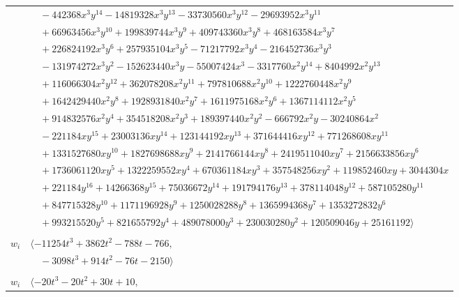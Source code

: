 \documentclass[11pt]{article}
\begin{document}
\begin{longtable}{@{}ll@{}}
 & $\quad -442368x^{3}y^{14}-14819328x^{3}y^{13}-33730560x^{3}y^{12}-29693952x^{3}y^{11}$\\
 & $\quad +66963456x^{3}y^{10}+199839744x^{3}y^{9}+409743360x^{3}y^{8}+468163584x^{3}y^{7}$\\
 & $\quad +226824192x^{3}y^{6}+257935104x^{3}y^{5}-71217792x^{3}y^{4}-216452736x^{3}y^{3}$\\
 & $\quad -131974272x^{3}y^{2}-152623440x^{3}y-55007424x^{3}-3317760x^{2}y^{14}+8404992x^{2}y^{13}$\\
 & $\quad +116066304x^{2}y^{12}+362078208x^{2}y^{11}+797810688x^{2}y^{10}+1222760448x^{2}y^{9}$\\
 & $\quad +1642429440x^{2}y^{8}+1928931840x^{2}y^{7}+1611975168x^{2}y^{6}+1367114112x^{2}y^{5}$\\
 & $\quad +914832576x^{2}y^{4}+354518208x^{2}y^{3}+189397440x^{2}y^{2}-666792x^{2}y-30240864x^{2}$\\
 & $\quad -221184xy^{15}+23003136xy^{14}+123144192xy^{13}+371644416xy^{12}+771268608xy^{11}$\\
 & $\quad +1331527680xy^{10}+1827698688xy^{9}+2141766144xy^{8}+2419511040xy^{7}+2156633856xy^{6}$\\
 & $\quad +1736061120xy^{5}+1322259552xy^{4}+670361184xy^{3}+357548256xy^{2}+119852460xy+3044304x$\\
 & $\quad +221184y^{16}+14266368y^{15}+75036672y^{14}+191794176y^{13}+378114048y^{12}+587105280y^{11}$\\
 & $\quad +847715328y^{10}+1171196928y^{9}+1250028288y^{8}+1365994368y^{7}+1353272832y^{6}$\\
 & $\quad +993215520y^{5}+821655792y^{4}+489078000y^{3}+230030280y^{2}+120509046y+25161192\rangle$\\
\addlinespace[2pt]
\multicolumn{2}{@{}p{0.97\textwidth}@{}}{$i=12$, $D_i=16$, $\rho_{ij}$: $6{:}2, \allowbreak 8{:}1, \allowbreak 10{:}1, \allowbreak 17{:}2, \allowbreak 23{:}2, \allowbreak 29{:}2, \allowbreak 33{:}2, \allowbreak 34{:}1, \allowbreak 44{:}1, \allowbreak 49{:}2, \allowbreak 54{:}2$}\\
$w_i$ & $\langle -11254t^{3}+3862t^{2}-788t-766,$\\
 & $\quad -3098t^{3}+914t^{2}-76t-2150\rangle$\\
\addlinespace[2pt]
\multicolumn{2}{@{}p{0.97\textwidth}@{}}{$i=13$, $D_i=2$, $\rho_{ij}$: $21{:}2, \allowbreak 46{:}2, \allowbreak 51{:}1, \allowbreak 52{:}1$}\\
$w_i$ & $\langle -20t^{3}-20t^{2}+30t+10,$\\

\end{longtable}
\end{document}
